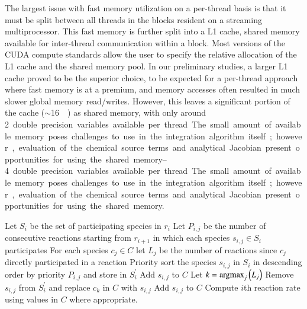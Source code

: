 \documentclass[preprint]{elsarticle}
\newcommand{\argmax}{\operatornamewithlimits{argmax}}
\begin{document}
The largest issue with fast memory utilization on a per-thread basis is that it must be split between all threads in the blocks resident on a streaming multiprocessor.
This fast memory is further split into a L1 cache, shared memory available for inter-thread communication within a block.
Most versions of the CUDA compute standards allow the user to specify the relative allocation of the L1 cache and the shared memory pool.
In our preliminary studies, a larger L1 cache proved to be the superior choice, to be expected for a per-thread approach where fast memory is at a premium, and memory accesses often resulted in much slower global memory read/writes.
However, this leaves a significant portion of the cache ($\sim$\SI{16}{\kilo\byte}) as shared memory, with only around \SIrange{2}{4} double precision variables available per thread.
The small amount of available memory poses challenges to use in the integration algorithm itself; however, evaluation of the chemical source terms and analytical Jacobian present opportunities for using the shared memory.

\begin{algorithm}[htb]
\caption{\textbf{Algorithm:} A procedure for memory caching during evaluation of reaction rates.\label{A:shared_mem_caching}}
\begin{algorithmic}[0]
    \State Let $S_i$ be the set of participating species in $r_i$
    \State Let $P_{i,j}$ be the number of consecutive reactions starting from $r_{i + 1}$ in which each species $s_{i,j} \in S_i$ participates
    \State For each species $c_j \in C$ let $L_j$ be the number of reactions since $c_j$ directly participated in a reaction
    \State Priority sort the species $s_{i,j}$ in $S_{i}$ in descending order by priority $P_{i,j}$ and store in $S_{i}^{\prime}$
		\State Add $s_{i,j}$ to $C$
	  \State Let $k = \argmax_j \left(L_j \right)$
	  \State Remove $s_{i,j}$ from $S_{i}^{\prime}$ and replace $c_k$ in $C$ with $s_{i,j}$
      \EndIf
    \EndFor
		\State Add $s_{i,j}$ to $C$
      \EndIf
    \EndFor
    \State Compute $i$th reaction rate using values in $C$ where appropriate.
  \EndFor
\end{algorithmic}
\end{algorithm}
\end{document}
